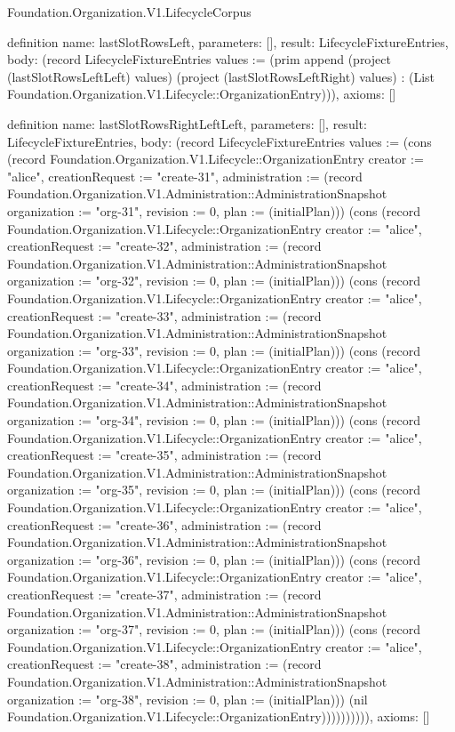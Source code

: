 \begin{lexlean}{Foundation.Organization.V1.LifecycleCorpus}
\begin{semanticmodule}
definition{
  name: lastSlotRowsLeft,
  parameters: [],
  result: LifecycleFixtureEntries,
  body: (record LifecycleFixtureEntries {values := (prim append (project (lastSlotRowsLeftLeft) values) (project (lastSlotRowsLeftRight) values) : (List Foundation.Organization.V1.Lifecycle::OrganizationEntry))}),
  axioms: []
}

definition{
  name: lastSlotRowsRightLeftLeft,
  parameters: [],
  result: LifecycleFixtureEntries,
  body: (record LifecycleFixtureEntries {values := (cons (record Foundation.Organization.V1.Lifecycle::OrganizationEntry {creator := "alice", creationRequest := "create-31", administration := (record Foundation.Organization.V1.Administration::AdministrationSnapshot {organization := "org-31", revision := 0, plan := (initialPlan)})}) (cons (record Foundation.Organization.V1.Lifecycle::OrganizationEntry {creator := "alice", creationRequest := "create-32", administration := (record Foundation.Organization.V1.Administration::AdministrationSnapshot {organization := "org-32", revision := 0, plan := (initialPlan)})}) (cons (record Foundation.Organization.V1.Lifecycle::OrganizationEntry {creator := "alice", creationRequest := "create-33", administration := (record Foundation.Organization.V1.Administration::AdministrationSnapshot {organization := "org-33", revision := 0, plan := (initialPlan)})}) (cons (record Foundation.Organization.V1.Lifecycle::OrganizationEntry {creator := "alice", creationRequest := "create-34", administration := (record Foundation.Organization.V1.Administration::AdministrationSnapshot {organization := "org-34", revision := 0, plan := (initialPlan)})}) (cons (record Foundation.Organization.V1.Lifecycle::OrganizationEntry {creator := "alice", creationRequest := "create-35", administration := (record Foundation.Organization.V1.Administration::AdministrationSnapshot {organization := "org-35", revision := 0, plan := (initialPlan)})}) (cons (record Foundation.Organization.V1.Lifecycle::OrganizationEntry {creator := "alice", creationRequest := "create-36", administration := (record Foundation.Organization.V1.Administration::AdministrationSnapshot {organization := "org-36", revision := 0, plan := (initialPlan)})}) (cons (record Foundation.Organization.V1.Lifecycle::OrganizationEntry {creator := "alice", creationRequest := "create-37", administration := (record Foundation.Organization.V1.Administration::AdministrationSnapshot {organization := "org-37", revision := 0, plan := (initialPlan)})}) (cons (record Foundation.Organization.V1.Lifecycle::OrganizationEntry {creator := "alice", creationRequest := "create-38", administration := (record Foundation.Organization.V1.Administration::AdministrationSnapshot {organization := "org-38", revision := 0, plan := (initialPlan)})}) (nil Foundation.Organization.V1.Lifecycle::OrganizationEntry)))))))))}),
  axioms: []
}


\end{semanticmodule}
\end{lexlean}
